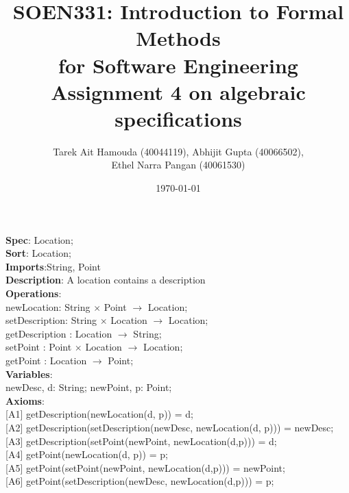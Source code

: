 \documentclass[12pt]{article}
\title{SOEN331: Introduction to Formal Methods\\for Software Engineering\\
Assignment 4 on algebraic specifications}
\author{Tarek Ait Hamouda (40044119), Abhijit Gupta (40066502), \\Ethel Narra Pangan (40061530)}
\date{\today}
\begin{document}
\begin{spacing}{1.5}

\maketitle

\noindent \textbf{Spec}: Location;\\
\noindent \textbf{Sort}: Location;\\
\noindent \textbf{Imports}:String, Point\\
\noindent \textbf{Description}: A location contains a description \\
\noindent \textbf{Operations}:\\
\hspace*{5mm} newLocation: String $\times$ Point $\rightarrow$ Location;\\
\hspace*{5mm} setDescription: String $\times$ Location $\rightarrow$ Location;\\
\hspace*{5mm} getDescription : Location $\rightarrow$ String;\\
\hspace*{5mm} setPoint : Point $\times$ Location $\rightarrow$ Location;\\
\hspace*{5mm} getPoint : Location $\rightarrow$ Point;\\
\noindent \textbf{Variables}:\\
\hspace*{5mm} newDesc, d: String; newPoint, p: Point;\\
\noindent \textbf{Axioms}:\\
\hspace*{5mm} [A1] getDescription(newLocation(d, p)) = d;\\
\hspace*{5mm} [A2] getDescription(setDescription(newDesc, newLocation(d, p))) = newDesc;\\
\hspace*{5mm} [A3] getDescription(setPoint(newPoint, newLocation(d,p))) = d;\\
\hspace*{5mm} [A4] getPoint(newLocation(d, p)) = p;\\
\hspace*{5mm} [A5] getPoint(setPoint(newPoint, newLocation(d,p))) = newPoint;\\
\hspace*{5mm} [A6] getPoint(setDescription(newDesc, newLocation(d,p))) = p;\\

\end{spacing}
\end{document}
